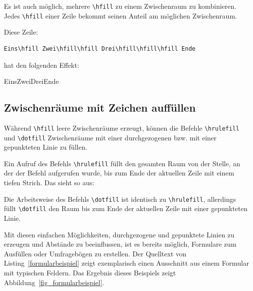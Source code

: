 \documentclass[a4paper,10pt,twoside]{scrbook}
\begin{document}
Es ist auch möglich, mehrere \verb!\hfill! zu einem Zwischenraum zu
kombinieren. Jedes \verb!\hfill! einer Zeile bekommt seinen Anteil am möglichen Zwischenraum.

Diese Zeile:

\begin{Verbatim}[frame=single]
Eins\hfill Zwei\hfill\hfill Drei\hfill\hfill\hfill Ende
\end{Verbatim}

hat den folgenden Effekt:

Eins\hfill Zwei\hfill\hfill Drei\hfill\hfill\hfill Ende


\subsection{Zwischenräume mit Zeichen auffüllen}

Während \verb!\hfill! leere Zwischenräume erzeugt, können die Befehle \verb!\hrulefill! und \verb!\dotfill! Zwischenräume mit einer durchgezogenen bzw. mit einer gepunkteten Linie zu füllen.

Ein Aufruf des
Befehls \verb!\hrulefill! 
füllt den gesamten Raum von der
Stelle, an der der Befehl aufgerufen wurde, 
bis zum Ende der aktuellen Zeile 
mit einem tiefen Strich. Das sieht so aus:\hrulefill


Die Arbeitsweise des Befehls \verb!\dotfill!
ist identisch zu \verb!\hrulefill!, allerdings füllt
\verb!\dotfill! den Raum bis zum Ende der aktuellen Zeile 
mit einer gepunkteten Linie.


Mit diesen einfachen Möglichkeiten, 
durchgezogene und gepunktete Linien zu 
erzeugen und Abstände zu beeinflussen, 
ist es bereits möglich, Formulare zum
Ausfüllen oder Umfragebögen zu erstellen. 
Der Quelltext von Listing~\ref{formularbeispiel} zeigt exemplarisch einen Ausschnitt aus einem Formular
mit typischen Feldern. Das Ergebnis dieses
Beispiels zeigt Abbildung~\ref{fig_formularbeispiel}.


\end{document}
